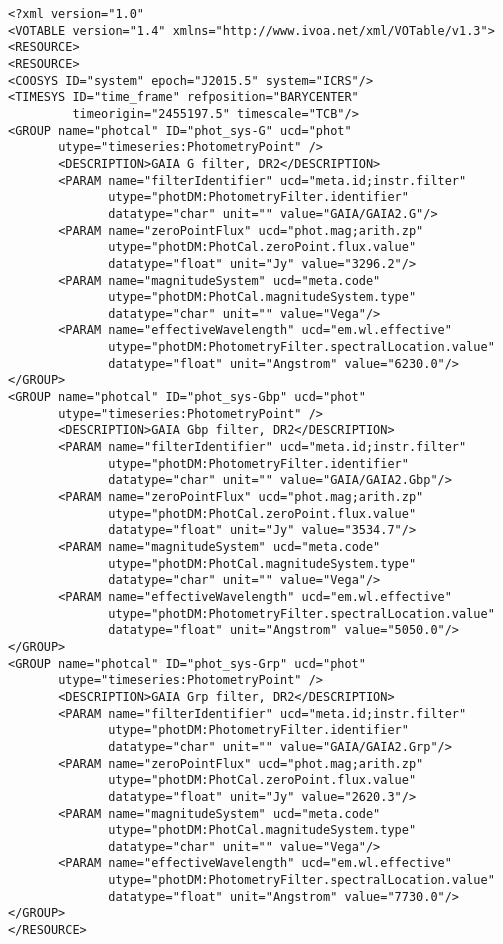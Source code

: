 \noindent
\begingroup\footnotesize
\begin{tcolorbox}
\begin{verbatim}
<?xml version="1.0" 
<VOTABLE version="1.4" xmlns="http://www.ivoa.net/xml/VOTable/v1.3">
<RESOURCE>
<RESOURCE>
<COOSYS ID="system" epoch="J2015.5" system="ICRS"/>
<TIMESYS ID="time_frame" refposition="BARYCENTER" 
         timeorigin="2455197.5" timescale="TCB"/>
<GROUP name="photcal" ID="phot_sys-G" ucd="phot" 
       utype="timeseries:PhotometryPoint" /> 
       <DESCRIPTION>GAIA G filter, DR2</DESCRIPTION>
       <PARAM name="filterIdentifier" ucd="meta.id;instr.filter" 
              utype="photDM:PhotometryFilter.identifier" 
              datatype="char" unit="" value="GAIA/GAIA2.G"/>
       <PARAM name="zeroPointFlux" ucd="phot.mag;arith.zp" 
              utype="photDM:PhotCal.zeroPoint.flux.value" 
              datatype="float" unit="Jy" value="3296.2"/>
       <PARAM name="magnitudeSystem" ucd="meta.code" 
              utype="photDM:PhotCal.magnitudeSystem.type" 
              datatype="char" unit="" value="Vega"/>
       <PARAM name="effectiveWavelength" ucd="em.wl.effective" 
              utype="photDM:PhotometryFilter.spectralLocation.value" 
              datatype="float" unit="Angstrom" value="6230.0"/>
</GROUP>
<GROUP name="photcal" ID="phot_sys-Gbp" ucd="phot" 
       utype="timeseries:PhotometryPoint" /> 
       <DESCRIPTION>GAIA Gbp filter, DR2</DESCRIPTION>
       <PARAM name="filterIdentifier" ucd="meta.id;instr.filter" 
              utype="photDM:PhotometryFilter.identifier" 
              datatype="char" unit="" value="GAIA/GAIA2.Gbp"/>
       <PARAM name="zeroPointFlux" ucd="phot.mag;arith.zp" 
              utype="photDM:PhotCal.zeroPoint.flux.value" 
              datatype="float" unit="Jy" value="3534.7"/>
       <PARAM name="magnitudeSystem" ucd="meta.code" 
              utype="photDM:PhotCal.magnitudeSystem.type" 
              datatype="char" unit="" value="Vega"/>
       <PARAM name="effectiveWavelength" ucd="em.wl.effective" 
              utype="photDM:PhotometryFilter.spectralLocation.value" 
              datatype="float" unit="Angstrom" value="5050.0"/>
</GROUP>
<GROUP name="photcal" ID="phot_sys-Grp" ucd="phot" 
       utype="timeseries:PhotometryPoint" /> 
       <DESCRIPTION>GAIA Grp filter, DR2</DESCRIPTION>
       <PARAM name="filterIdentifier" ucd="meta.id;instr.filter" 
              utype="photDM:PhotometryFilter.identifier" 
              datatype="char" unit="" value="GAIA/GAIA2.Grp"/>
       <PARAM name="zeroPointFlux" ucd="phot.mag;arith.zp" 
              utype="photDM:PhotCal.zeroPoint.flux.value" 
              datatype="float" unit="Jy" value="2620.3"/>
       <PARAM name="magnitudeSystem" ucd="meta.code" 
              utype="photDM:PhotCal.magnitudeSystem.type" 
              datatype="char" unit="" value="Vega"/>
       <PARAM name="effectiveWavelength" ucd="em.wl.effective" 
              utype="photDM:PhotometryFilter.spectralLocation.value" 
              datatype="float" unit="Angstrom" value="7730.0"/>
</GROUP>
</RESOURCE>

\end{verbatim}
\end{tcolorbox}
\endgroup

